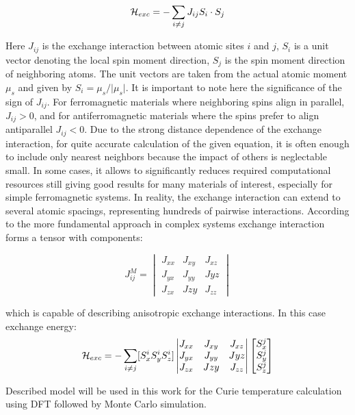 \begin{equation}
{\cal H}_{exc}=-\sum_{i\neq j} J_{ij}S_i \cdot S_j
\end{equation}

Here $J_{ij}$ is the exchange interaction between atomic sites $i$ and $j$, $S_i$ is a unit vector denoting the local spin moment direction, $S_j$ is the spin moment direction of neighboring atoms. The unit vectors are taken from the actual atomic moment $\mu_s$ and given by $S_i=\mu_s/\vert\mu_s\vert$.
It is important to note here the significance of the sign of $J_{ij}$. For ferromagnetic materials where neighboring spins align in parallel, $J_{ij} > 0$, and for antiferromagnetic materials where the spins prefer to align antiparallel $J_{ij} < 0$.
Due to the strong distance dependence of the exchange interaction, for quite accurate calculation of the given equation, it is often enough to include only nearest neighbors because the impact of others is neglectable small. In some cases, it allows to significantly reduces required computational resources still giving good results for many materials of interest, especially for simple ferromagnetic systems. In reality, the exchange interaction can extend to several atomic spacings, representing hundreds of pairwise interactions.
According to the more fundamental approach in complex systems exchange interaction forms a tensor with components:

\begin{equation}J_{ij}^M=
\begin{vmatrix}J_{xx} & J_{xy} & J_{xz}\\J_{yx} & J_{yy} & J{yz}\\J_{zx} & J{zy} & J_{zz}\end{vmatrix}
\end{equation}

which is capable of describing anisotropic exchange interactions. In this case exchange energy:
\begin{equation}
{\cal H}_{exc}=-\sum_{i\neq j} [S_x^i S_y^i S_z^i]
\begin{vmatrix}
J_{xx} &J_{xy} & J_{xz}\\
J_{yx} & J_{yy} & J{yz}\\
J_{zx} & J{zy} & J_{zz}
\end{vmatrix}
\begin{bmatrix}
S_{x}^j\\
S_{y}^j\\
S_{z}^j
\end{bmatrix}
\end{equation}

Described model will be used in this work for the Curie temperature calculation using DFT followed by Monte Carlo simulation.
